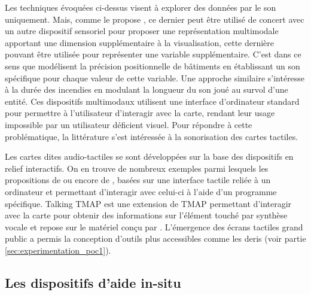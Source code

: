 \newpar{}


Les techniques évoquées ci-dessus visent à explorer des données par le son uniquement. Mais, comme le propose \citet{Krygier1994}, ce dernier peut être utilisé de concert avec un autre dispositif sensoriel pour proposer une représentation multimodale apportant une dimension supplémentaire à la visualisation, cette dernière pouvant être utilisée pour représenter une variable supplémentaire. C'est dans ce sens que \citet{Bearman2010} modélisent la précision positionnelle de bâtiments en établissant un son spécifique pour chaque valeur de cette variable. Une approche similaire \citep{Foteinou2022} s'intéresse à la durée des incendies en modulant la longueur du son joué au survol d'une entité. Ces dispositifs multimodaux utilisent une interface d'ordinateur standard pour permettre à l'utilisateur d'interagir avec la carte, rendant leur usage impossible par un utilisateur déficient visuel. Pour répondre à cette problématique, la littérature s'est intéressée à la sonorisation des cartes tactiles.

\newpar{}


Les cartes dites audio-tactiles se sont développées sur la base des dispositifs en relief interactifs. On en trouve de nombreux exemples parmi lesquels les propositions de \citet{Loetzsch1994} ou encore de \citet{Landau2001}, basées sur une interface tactile reliée à un ordinateur et permettant d'interagir avec celui-ci à l'aide d'un programme spécifique.
Talking TMAP \citep{Miele2006} est une extension de TMAP \citep{Miele2004} permettant d'interagir avec la carte pour obtenir des informations sur l'élément touché par synthèse vocale et repose sur le matériel conçu par \citet{Landau2001}. L'émergence des écrans tactiles grand public a permis la conception d'outils plus accessibles comme les \glspl{deri} \citep{Brock2015} (voir partie \ref{sec:experimentation_poc1}).

\subsection{Les dispositifs d'aide in-situ}

\label{ea_dispositifs_in_situ}


